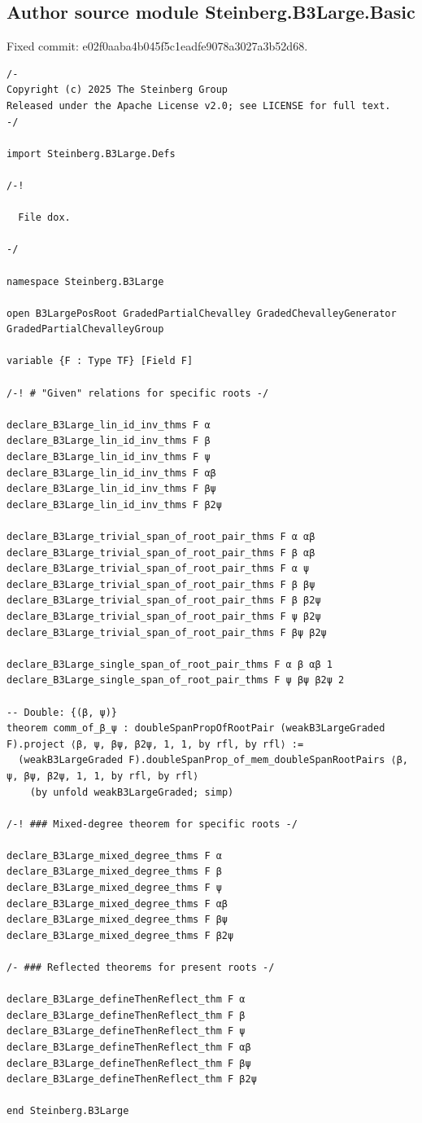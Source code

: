 \subsection*{Author source module Steinberg.B3Large.Basic}
\noindent Fixed commit: e02f0aaba4b045f5c1eadfe9078a3027a3b52d68.
\begin{Verbatim}
/-
Copyright (c) 2025 The Steinberg Group
Released under the Apache License v2.0; see LICENSE for full text.
-/

import Steinberg.B3Large.Defs

/-!

  File dox.

-/

namespace Steinberg.B3Large

open B3LargePosRoot GradedPartialChevalley GradedChevalleyGenerator GradedPartialChevalleyGroup

variable {F : Type TF} [Field F]

/-! # "Given" relations for specific roots -/

declare_B3Large_lin_id_inv_thms F α
declare_B3Large_lin_id_inv_thms F β
declare_B3Large_lin_id_inv_thms F ψ
declare_B3Large_lin_id_inv_thms F αβ
declare_B3Large_lin_id_inv_thms F βψ
declare_B3Large_lin_id_inv_thms F β2ψ

declare_B3Large_trivial_span_of_root_pair_thms F α αβ
declare_B3Large_trivial_span_of_root_pair_thms F β αβ
declare_B3Large_trivial_span_of_root_pair_thms F α ψ
declare_B3Large_trivial_span_of_root_pair_thms F β βψ
declare_B3Large_trivial_span_of_root_pair_thms F β β2ψ
declare_B3Large_trivial_span_of_root_pair_thms F ψ β2ψ
declare_B3Large_trivial_span_of_root_pair_thms F βψ β2ψ

declare_B3Large_single_span_of_root_pair_thms F α β αβ 1
declare_B3Large_single_span_of_root_pair_thms F ψ βψ β2ψ 2

-- Double: {(β, ψ)}
theorem comm_of_β_ψ : doubleSpanPropOfRootPair (weakB3LargeGraded F).project ⟨β, ψ, βψ, β2ψ, 1, 1, by rfl, by rfl⟩ :=
  (weakB3LargeGraded F).doubleSpanProp_of_mem_doubleSpanRootPairs ⟨β, ψ, βψ, β2ψ, 1, 1, by rfl, by rfl⟩
    (by unfold weakB3LargeGraded; simp)

/-! ### Mixed-degree theorem for specific roots -/

declare_B3Large_mixed_degree_thms F α
declare_B3Large_mixed_degree_thms F β
declare_B3Large_mixed_degree_thms F ψ
declare_B3Large_mixed_degree_thms F αβ
declare_B3Large_mixed_degree_thms F βψ
declare_B3Large_mixed_degree_thms F β2ψ

/- ### Reflected theorems for present roots -/

declare_B3Large_defineThenReflect_thm F α
declare_B3Large_defineThenReflect_thm F β
declare_B3Large_defineThenReflect_thm F ψ
declare_B3Large_defineThenReflect_thm F αβ
declare_B3Large_defineThenReflect_thm F βψ
declare_B3Large_defineThenReflect_thm F β2ψ

end Steinberg.B3Large
\end{Verbatim}

